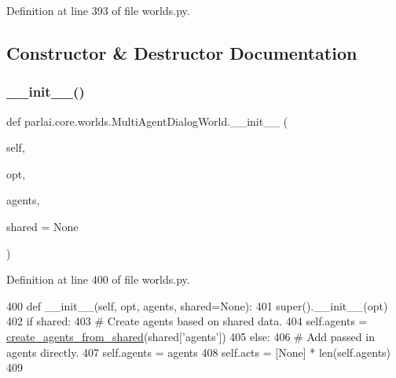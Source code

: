 Definition at line 393 of file worlds.\+py.



\subsection{Constructor \& Destructor Documentation}
\mbox{\label{classparlai_1_1core_1_1worlds_1_1MultiAgentDialogWorld_a228cc89020ff34ec71bed43fd5115941}} 
\subsubsection{\texorpdfstring{\+\_\+\+\_\+init\+\_\+\+\_\+()}{\_\_init\_\_()}}
{\footnotesize\ttfamily def parlai.\+core.\+worlds.\+Multi\+Agent\+Dialog\+World.\+\_\+\+\_\+init\+\_\+\+\_\+ (\begin{DoxyParamCaption}\item[{}]{self,  }\item[{}]{opt,  }\item[{}]{agents,  }\item[{}]{shared = {\ttfamily None} }\end{DoxyParamCaption})}



Definition at line 400 of file worlds.\+py.


\begin{DoxyCode}
400     \textcolor{keyword}{def }\_\_init\_\_(self, opt, agents, shared=None):
401         super().\_\_init\_\_(opt)
402         \textcolor{keywordflow}{if} shared:
403             \textcolor{comment}{# Create agents based on shared data.}
404             self.agents = \hyperlink{namespaceparlai_1_1core_1_1agents_a5600530545f5e60a79e2d657b5af1d8c}{create\_agents\_from\_shared}(shared[\textcolor{stringliteral}{'agents'}])
405         \textcolor{keywordflow}{else}:
406             \textcolor{comment}{# Add passed in agents directly.}
407             self.agents = agents
408         self.acts = [\textcolor{keywordtype}{None}] * len(self.agents)
409 
\end{DoxyCode}



